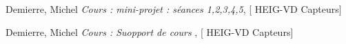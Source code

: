 \begin{thebibliography}{9}

    Demierre, Michel
    \textit{Cours : mini-projet : séances 1,2,3,4,5},
    [ HEIG-VD Capteurs]
    
    Demierre, Michel
    \textit{Cours : Suopport de cours },
    [ HEIG-VD Capteurs]
    
    
    \end{thebibliography}